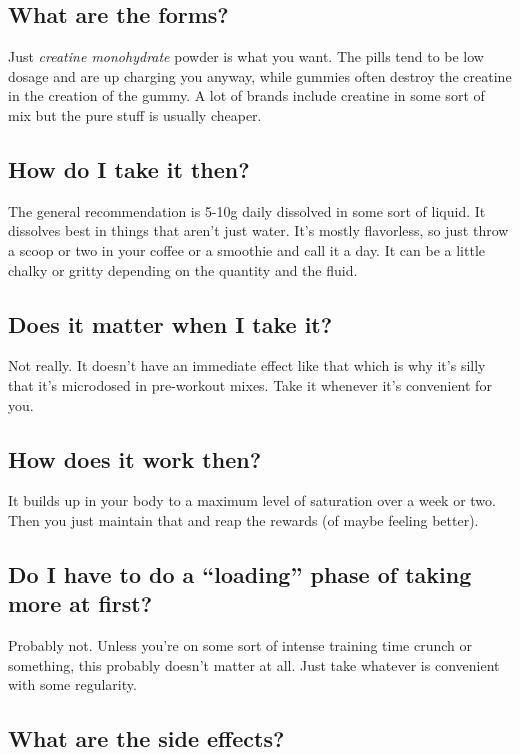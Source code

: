 \documentclass{article}
\begin{document}
\subsection{What are the forms?}

Just \textit{creatine monohydrate} powder is what you want. The pills tend to be low dosage and are up charging you anyway, while gummies often destroy the creatine in the creation of the gummy. A lot of brands include creatine in some sort of mix but the pure stuff is usually cheaper.

\subsection{How do I take it then?}

The general recommendation is 5-10g daily dissolved in some sort of liquid. It dissolves best in things that aren’t just water. It’s mostly flavorless, so just throw a scoop or two in your coffee or a smoothie and call it a day. It can be a little chalky or gritty depending on the quantity and the fluid.

\subsection{Does it matter when I take it?}

Not really. It doesn’t have an immediate effect like that which is why it’s silly that it’s microdosed in pre-workout mixes. Take it whenever it’s convenient for you.

\subsection{How does it work then?}

It builds up in your body to a maximum level of saturation over a week or two. Then you just maintain that and reap the rewards (of maybe feeling better).

\subsection{Do I have to do a “loading” phase of taking more at first?}

Probably not. Unless you’re on some sort of intense training time crunch or something, this probably doesn’t matter at all. Just take whatever is convenient with some regularity.

\subsection{What are the side effects?}
\end{document}
